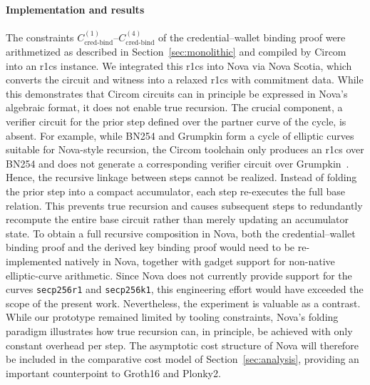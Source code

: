 \paragraph{Implementation and results} 
The constraints $C_{\text{cred-bind}}^{(1)}$--$C_{\text{cred-bind}}^{(4)}$ of the credential--wallet binding proof were arithmetized as described in Section~\ref{sec:monolithic} and compiled by Circom into an \acrshort{r1cs} instance. We integrated this \acrshort{r1cs} into Nova via Nova Scotia, which converts the circuit and witness into a relaxed \acrshort{r1cs} with commitment data. While this demonstrates that Circom circuits can in principle be expressed in Nova’s algebraic format, it does not enable true recursion. The crucial component, a verifier circuit for the prior step defined over the partner curve of the cycle, is absent. For example, while BN254 and Grumpkin form a cycle of elliptic curves suitable for Nova-style recursion, the Circom toolchain only produces an \acrshort{r1cs} over BN254 and does not generate a corresponding verifier circuit over Grumpkin~\cite{cryptoeprint:2023/573}. Hence, the recursive linkage between steps cannot be realized. Instead of folding the prior step into a compact accumulator, each step re-executes the full base relation. This prevents true recursion and causes subsequent steps to redundantly recompute the entire base circuit rather than merely updating an accumulator state. To obtain a full recursive composition in Nova, both the credential--wallet binding proof and the derived key binding proof would need to be re-implemented natively in Nova, together with gadget support for non-native elliptic-curve arithmetic. Since Nova does not currently provide support for the curves \texttt{secp256r1} and \texttt{secp256k1}, this engineering effort would have exceeded the scope of the present work. 
Nevertheless, the experiment is valuable as a contrast. While our prototype remained limited by tooling constraints, Nova’s folding paradigm illustrates how true recursion can, in principle, be achieved with only constant overhead per step. The asymptotic cost structure of Nova will therefore be included in the comparative cost model of Section~\ref{sec:analysis}, providing an important counterpoint to Groth16 and Plonky2.
